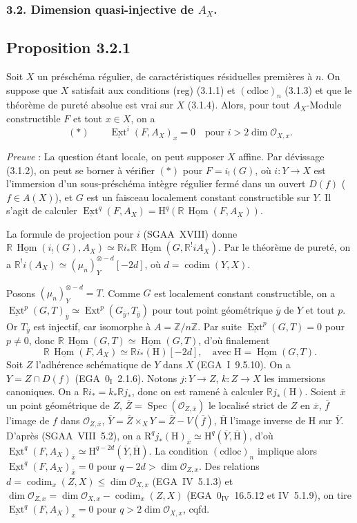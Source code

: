 \documentclass[11pt]{article}
\DeclareMathOperator{\codim}{codim}
\providecommand{\cO}{\mathcal{O}}
\renewcommand{\H}{\mathrm{H}}
\DeclareMathOperator{\Hom}{Hom}
\DeclareMathOperator{\Ext}{Ext}
\DeclareMathOperator{\Spec}{Spec}
\newcommand{\R}{\mathbb{R}}\newcommand{\RHomCore}{\mathbb{R}\mathrm{Hom}}
\newcommand{\Z}{\mathbb{Z}}
\newcommand{\ol}[1]{\overline{#1}}
\providecommand{\Hom}{\operatorname{Hom}}
\providecommand{\R}{\mathrm R}
\providecommand{\Z}{\mathbb Z}
\providecommand{\Spec}{\operatorname{Spec}}
\providecommand{\Spec}{\operatorname{Spec}}
\providecommand{\Hom}{\operatorname{Hom}}
\providecommand{\Spec}{\operatorname{Spec}}
\providecommand{\Spec}{\operatorname{Spec}}
\begin{document}
\subsubsection*{3.2. Dimension quasi-injective de \texorpdfstring{$A_X$}{A\_X}.}

\subsection*{Proposition 3.2.1}
Soit $X$ un préschéma régulier, de caractéristiques résiduelles premières à $n$. On suppose que $X$ satisfait aux conditions (reg) (3.1.1) et $(\mathrm{cdloc})_n$ (3.1.3) et que le théorème de pureté absolue est vrai sur $X$ (3.1.4). Alors, pour tout $A_X$-Module constructible $F$ et tout $x \in X$, on a
\[
(*) \qquad \underline{\Ext}^i(F, A_X)_x = 0 \quad \text{pour } i > 2\dim \cO_{X,x}.
\]

\emph{Preuve} : La question étant locale, on peut supposer $X$ affine. Par dévissage (3.1.2), on peut se borner à vérifier $(*)$ pour $F = i_{!}(G)$, où $i : Y \to X$ est l'immersion d'un sous-préschéma intègre régulier fermé dans un ouvert $D(f)$ ($f \in A(X)$), et $G$ est un faisceau localement constant
constructible sur $Y$. Il s'agit de calculer $\underline{\Ext}^q(F, A_X) = \H^q(\R\,\underline{\Hom}(F, A_X))$.

La formule de projection pour $i$ (SGAA~XVIII) donne $\R\,\underline{\Hom}(i_{!}(G), A_X) \simeq \R i_{*} \R\,\underline{\Hom}(G, \R^{!}iA_X)$. Par le théorème de pureté, on a $\R^{!}i(A_X) \simeq (\mu_n)^{\otimes -d}_Y[-2d]$, où $d = \codim(Y,X)$.

Posons $(\mu_n)^{\otimes -d}_Y = T$. Comme $G$ est localement constant constructible, on a $\underline{\Ext}^p(G,T)_{\ol{y}} \simeq \Ext^p(G_{\ol{y}}, T_{\ol{y}})$ pour tout point géométrique $\ol{y}$ de $Y$ et tout $p$. Or $T_{\ol{y}}$ est injectif, car isomorphe à $A = \Z/n\Z$. Par suite $\underline{\Ext}^p(G,T) = 0$ pour $p \neq 0$, donc $\R\,\underline{\Hom}(G,T) \simeq \underline{\Hom}(G,T)$, d'où finalement
\[
\R\,\underline{\Hom}(F, A_X) \simeq \R i_{*}(\H)[-2d], \quad \text{avec } \H = \underline{\Hom}(G,T).
\]
Soit $Z$ l'adhérence schématique de $Y$ dans $X$ (EGA~I~9.5.10). On a $Y = Z \cap D(f)$ (EGA~$0_{\mathrm{I}}$~2.1.6). Notons $j : Y \to Z$, $k : Z \to X$ les immersions canoniques. On a $\R i_{*} = k_{*} \R j_{*}$, donc on est ramené à calculer $\R j_{*}(\H)$. Soient $\ol{x}$ un point géométrique de $Z$, $\ol{Z} = \Spec(\cO_{Z,\ol{x}})$ le localisé strict de $Z$ en $\ol{x}$, $\ol{f}$ l'image de $f$ dans $\cO_{Z,\ol{x}}$, $\ol{Y} = \ol{Z} \times_X Y = \ol{Z} - V(\ol{f})$, $\ol{\H}$ l'image inverse de $\H$ sur $\ol{Y}$. D'après (SGAA~VIII~5.2), on a $\mathrm{R}^q j_{*}(\H)_{\ol{x}} \simeq \H^q(\ol{Y}, \ol{\H})$, d'où $\underline{\Ext}^q(F, A_X)_{\ol{x}} \simeq \H^{q-2d}(\ol{Y}, \ol{\H})$. La condition $(\mathrm{cdloc})_n$ implique alors $\underline{\Ext}^q(F, A_X)_{\ol{x}} = 0$ pour $q - 2d > \dim \cO_{Z,x}$. Des relations $d = \codim_{x}(Z,X) \leqslant \dim \cO_{X,x}$ (EGA~IV~5.1.3) et $\dim \cO_{Z,x} = \dim \cO_{X,x} - \codim_{x}(Z,X)$ (EGA~$0_{\mathrm{IV}}$~16.5.12 et IV~5.1.9), on tire $\underline{\Ext}^q(F, A_X)_x = 0$ pour $q > 2\dim \cO_{X,x}$, cqfd.
\end{document}
